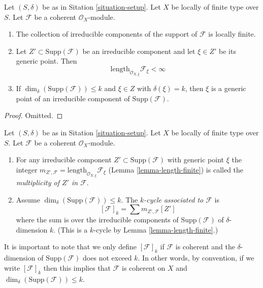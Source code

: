 \begin{lemma}
\label{lemma-length-finite}
Let $(S, \delta)$ be as in Sitation \ref{situation-setup}.
Let $X$ be locally of finite type over $S$.
Let $\mathcal{F}$ be a coherent $\mathcal{O}_X$-module.
\begin{enumerate}
\item The collection of irreducible components of the support of
$\mathcal{F}$ is locally finite.
\item Let $Z' \subset \text{Supp}(\mathcal{F})$
be an irreducible component and
let $\xi \in Z'$ be its generic point.
Then
$$
\text{length}_{\mathcal{O}_{X, \xi}} \mathcal{F}_\xi < \infty
$$
\item If $\dim_\delta(\text{Supp}(\mathcal{F})) \leq k$
and $\xi \in Z$ with $\delta(\xi) = k$, then $\xi$ is a
generic point of an irreducible component of $\text{Supp}(\mathcal{F})$.
\end{enumerate}
\end{lemma}

\begin{proof}
Omitted.
\end{proof}

\begin{definition}
\label{definition-cycle-associated-to-coherent-sheaf}
Let $(S, \delta)$ be as in Sitation \ref{situation-setup}.
Let $X$ be locally of finite type over $S$.
Let $\mathcal{F}$ be a coherent $\mathcal{O}_X$-module.
\begin{enumerate}
\item For any irreducible component $Z' \subset \text{Supp}(\mathcal{F})$
with generic point $\xi$ the integer
$m_{Z', \mathcal{F}} = \text{length}_{\mathcal{O}_{X, \xi}} \mathcal{F}_\xi$
(Lemma \ref{lemma-length-finite})
is called the {\it multiplicity of $Z'$ in $\mathcal{F}$}.
\item Assume $\dim_\delta(\text{Supp}(\mathcal{F})) \leq k$.
The {\it $k$-cycle associated to $\mathcal{F}$} is
$$
[\mathcal{F}]_k
=
\sum m_{Z', \mathcal{F}}[Z']
$$
where the sum is over the irreducible components of
$\text{Supp}(\mathcal{F})$ of $\delta$-dimension $k$.
(This is a $k$-cycle by Lemma \ref{lemma-length-finite}.)
\end{enumerate}
\end{definition}

\noindent
It is important to note that we only define $[\mathcal{F}]_k$
if $\mathcal{F}$ is coherent and the $\delta$-dimension
of $\text{Supp}(\mathcal{F})$ does not exceed $k$. In other words,
by convention, if we write $[\mathcal{F}]_k$ then this implies that
$\mathcal{F}$ is coherent on $X$ and
$\dim_\delta(\text{Supp}(\mathcal{F})) \leq k$.

